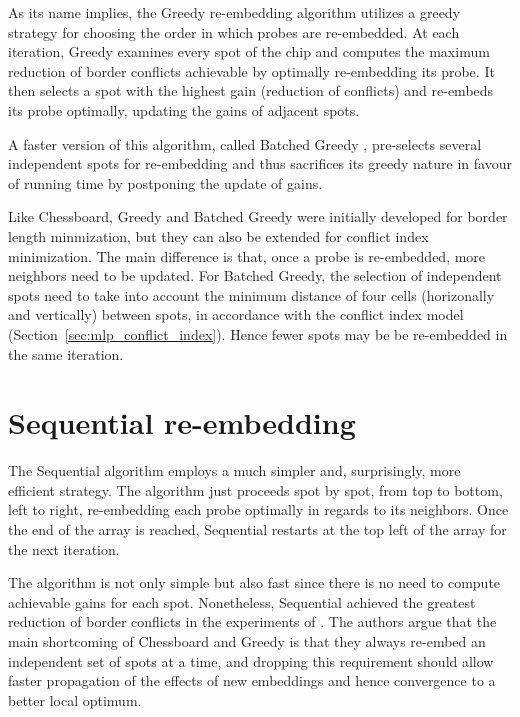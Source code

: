 As its name implies, the Greedy re-embedding algorithm \citep{Kahng2002}
utilizes a greedy strategy for choosing the order in which probes are
re-embedded. At each iteration, Greedy examines every spot of the chip and
computes the maximum reduction of border conflicts achievable by optimally
re-embedding its probe. It then selects a spot with the highest gain (reduction
of conflicts) and re-embeds its probe optimally, updating the gains of adjacent
spots.

A faster version of this algorithm, called Batched Greedy \citep{Kahng2002},
pre-selects several independent spots for re-embedding and thus sacrifices its
greedy nature in favour of running time by postponing the update of gains.

Like Chessboard, Greedy and Batched Greedy were initially developed for border
length minmization, but they can also be extended for conflict index
minimization. The main difference is that, once a probe is re-embedded, more
neighbors need to be updated. For Batched Greedy, the selection of independent
spots need to take into account the minimum distance of four cells (horizonally
and vertically) between spots, in accordance with the conflict index model
(Section~\ref{sec:mlp_conflict_index}). Hence fewer spots may be be re-embedded
in the same iteration.

\section{Sequential re-embedding}
\label{sec:reembed_sequential}

The Sequential algorithm \citep{Kahng2003a} employs a much simpler and,
surprisingly, more efficient strategy. The algorithm just proceeds spot by spot,
from top to bottom, left to right, re-embedding each probe optimally in regards
to its neighbors. Once the end of the array is reached, Sequential restarts at
the top left of the array for the next iteration.

The algorithm is not only simple but also fast since there is no need to compute
achievable gains for each spot. Nonetheless, Sequential achieved the greatest
reduction of border conflicts in the experiments of \citet{Kahng2003a}. The
authors argue that the main shortcoming of Chessboard and Greedy is that they
always re-embed an independent set of spots at a time, and dropping this
requirement should allow faster propagation of the effects of new embeddings and
hence convergence to a better local optimum.

